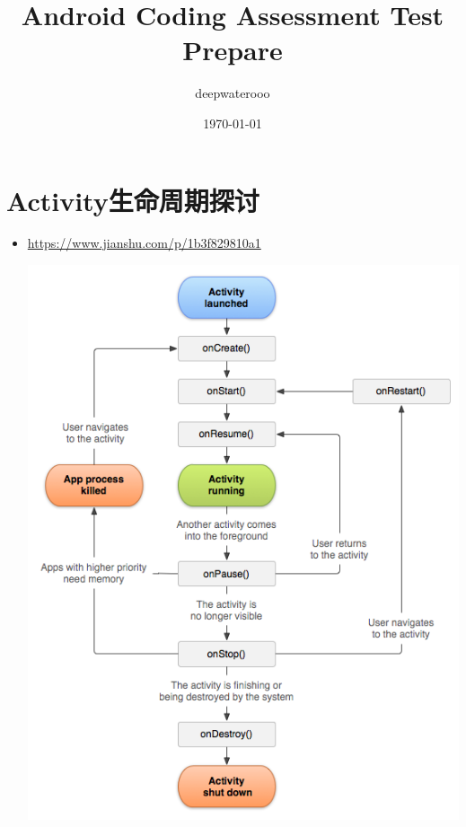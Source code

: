 \documentclass[9pt, b5paaper]{book}
\author{deepwaterooo}
\date{\today}
\title{Android Coding Assessment Test Prepare}
\begin{document}
\maketitle
\tableofcontents


\chapter{Activity生命周期探讨}
\label{sec-1}
\begin{itemize}
\item \url{https://www.jianshu.com/p/1b3f829810a1}

\includegraphics[width=.9\linewidth]{./pic/activityLifeCycle.png}
\end{itemize}
\end{document}
